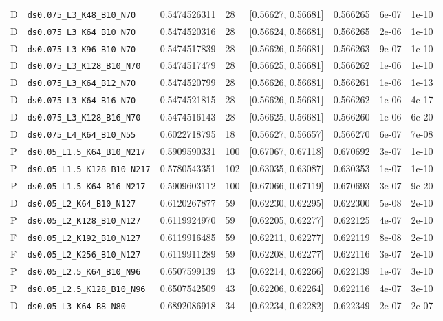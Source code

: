 \begin{longtable}{@{}llrllllr@{}}
D & \texttt{ds0.075\_L3\_K48\_B10\_N70} & 0.5474526311 & 28 & [0.56627, 0.56681] & 0.566265 & 6e-07 & 1e-10\\
D & \texttt{ds0.075\_L3\_K64\_B10\_N70} & 0.5474520316 & 28 & [0.56624, 0.56681] & 0.566265 & 2e-06 & 1e-10\\
D & \texttt{ds0.075\_L3\_K96\_B10\_N70} & 0.5474517839 & 28 & [0.56626, 0.56681] & 0.566263 & 9e-07 & 1e-10\\
D & \texttt{ds0.075\_L3\_K128\_B10\_N70} & 0.5474517479 & 28 & [0.56625, 0.56681] & 0.566262 & 1e-06 & 1e-10\\
D & \texttt{ds0.075\_L3\_K64\_B12\_N70} & 0.5474520799 & 28 & [0.56626, 0.56681] & 0.566261 & 1e-06 & 1e-13\\
D & \texttt{ds0.075\_L3\_K64\_B16\_N70} & 0.5474521815 & 28 & [0.56626, 0.56681] & 0.566262 & 1e-06 & 4e-17\\
D & \texttt{ds0.075\_L3\_K128\_B16\_N70} & 0.5474516143 & 28 & [0.56625, 0.56681] & 0.566260 & 1e-06 & 6e-20\\
D & \texttt{ds0.075\_L4\_K64\_B10\_N55} & 0.6022718795 & 18 & [0.56627, 0.56657] & 0.566270 & 6e-07 & 7e-08\\
P & \texttt{ds0.05\_L1.5\_K64\_B10\_N217} & 0.5909590331 & 100 & [0.67067, 0.67118] & 0.670692 & 3e-07 & 1e-10\\
P & \texttt{ds0.05\_L1.5\_K128\_B10\_N217} & 0.5780543351 & 102 & [0.63035, 0.63087] & 0.630353 & 1e-07 & 1e-10\\
P & \texttt{ds0.05\_L1.5\_K64\_B16\_N217} & 0.5909603112 & 100 & [0.67066, 0.67119] & 0.670693 & 3e-07 & 9e-20\\
D & \texttt{ds0.05\_L2\_K64\_B10\_N127} & 0.6120267877 & 59 & [0.62230, 0.62295] & 0.622300 & 5e-08 & 2e-10\\
P & \texttt{ds0.05\_L2\_K128\_B10\_N127} & 0.6119924970 & 59 & [0.62205, 0.62277] & 0.622125 & 4e-07 & 2e-10\\
F & \texttt{ds0.05\_L2\_K192\_B10\_N127} & 0.6119916485 & 59 & [0.62211, 0.62277] & 0.622119 & 8e-08 & 2e-10\\
F & \texttt{ds0.05\_L2\_K256\_B10\_N127} & 0.6119911289 & 59 & [0.62208, 0.62277] & 0.622116 & 3e-07 & 2e-10\\
P & \texttt{ds0.05\_L2.5\_K64\_B10\_N96} & 0.6507599139 & 43 & [0.62214, 0.62266] & 0.622139 & 1e-07 & 3e-10\\
P & \texttt{ds0.05\_L2.5\_K128\_B10\_N96} & 0.6507542509 & 43 & [0.62206, 0.62264] & 0.622116 & 4e-07 & 3e-10\\
D & \texttt{ds0.05\_L3\_K64\_B8\_N80} & 0.6892086918 & 34 & [0.62234, 0.62282] & 0.622349 & 2e-07 & 2e-07\\

\end{longtable}
